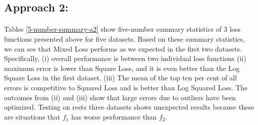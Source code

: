 \documentclass[runningheads]{llncs}
\begin{document}
\subsection{Approach 2:}
\paragraph{}

Tables \ref{5-number-summary-a2} show five-number summary statistics of 3 loss functions presented above for five datasets. Based on these summary statistics, we can see that Mixed Loss performs as we expected in the first two datasets. Specifically, (i) overall performance is between two individual loss functions (ii) maximum error is lower than Square Loss, and it is even better than the Log Square Loss in the first dataset. (iii) The mean of the top ten per cent of all errors is competitive to Squared Loss and is better than Log Squared Loss. The outcomes from (ii) and (iii) show that large errors due to outliers have been optimized. Testing on rests three datasets shows unexpected results because these are situations that $f_1$ has worse performance than $f_2$.


\end{document}

